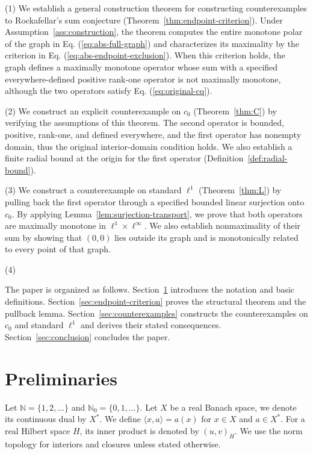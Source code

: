 \documentclass[11pt]{article}
\newcommand{\N}{\mathbb N}
\newcommand{\pair}[2]{\langle #1,#2\rangle}
\theoremstyle{definition}
\theoremstyle{remark}
\begin{document}
(1) We establish a general construction theorem for constructing counterexamples to Rockafellar's sum conjecture (Theorem~\ref{thm:endpoint-criterion}). Under Assumption~\ref{ass:construction}, the theorem computes the entire monotone polar of the graph in Eq. (\ref{eq:abs-full-graph}) and characterizes its maximality by the criterion in Eq. (\ref{eq:abs-endpoint-exclusion}). When this criterion holds, the graph defines a maximally monotone operator whose sum with a specified everywhere-defined positive rank-one operator is not maximally monotone, although the two operators satisfy Eq. (\ref{eq:original-cq}).

(2) We construct an explicit counterexample on $c_0$ (Theorem~\ref{thm:C}) by verifying the assumptions of this theorem. The second operator is bounded, positive, rank-one, and defined everywhere, and the first operator has nonempty domain, thus the original interior-domain condition holds. We also establish a finite radial bound at the origin for the first operator (Definition~\ref{def:radial-bound}). 

(3) We construct a counterexample on standard $\ell^1$ (Theorem~\ref{thm:L}) by pulling back the first operator through a specified bounded linear surjection onto $c_0$. By applying Lemma~\ref{lem:surjection-transport}, we prove that both operators are maximally monotone in $\ell^1\times\ell^\infty$. We also establish nonmaximality of their sum by showing that $(0,0)$ lies outside its graph and is monotonically related to every point of that graph.

(4) 

The paper is organized as follows. Section~\ref{sec:definitions} introduces the notation and basic definitions. Section~\ref{sec:endpoint-criterion} proves the structural theorem and the pullback lemma. Section~\ref{sec:counterexamples} constructs the counterexamples on $c_0$ and standard $\ell^1$ and derives their stated consequences. Section~\ref{sec:conclusion} concludes the paper. 


\section{Preliminaries}
\label{sec:definitions}
Let $\N=\{1,2,\ldots\}$ and $\N_0=\{0,1,\ldots\}$. Let $X$ be a real Banach space, we denote its continuous dual by $X^*$. We define $\pair{x}{a}=a(x)$ for $x\in X$ and $a\in X^*$. For a real Hilbert space $H$, its inner product is denoted by $(u,v)_H$. We use the norm topology for interiors and closures unless stated otherwise. 
\end{document}
